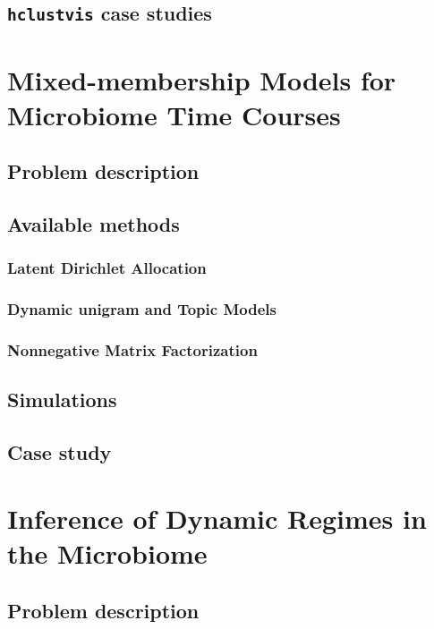 \documentclass{report}
\begin{document}
\section{\texttt{hclustvis} case studies}

\chapter{Mixed-membership Models for Microbiome Time Courses}

\section{Problem description}

\section{Available methods}

\subsection{Latent Dirichlet Allocation}

\subsection{Dynamic unigram and Topic Models}

\subsection{Nonnegative Matrix Factorization}

\section{Simulations}

\section{Case study}

\chapter{Inference of Dynamic Regimes in the Microbiome}

\section{Problem description}
\end{document}
